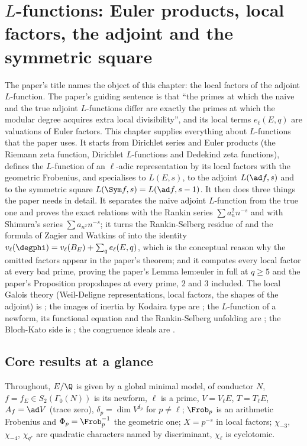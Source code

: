 \chapter{$L$-functions: Euler products, local factors, the adjoint and the symmetric square}\label{ch:lfunctions}

The paper's title names the object of this chapter: the local factors of the adjoint $L$-function. The paper's guiding sentence is that ``the
primes at which the naive and the true adjoint $L$-functions differ are exactly the primes at which the modular degree acquires extra local
divisibility'', and its local terms $e_\ell(E,q)$ are valuations of Euler factors. This chapter supplies everything about $L$-functions that the
paper uses. It starts from Dirichlet series and Euler products (the Riemann zeta function, Dirichlet $L$-functions and Dedekind zeta functions),
defines the $L$-function of an $\ell$-adic representation by its local factors with the geometric Frobenius, and specialises to $L(E,s)$, to the
adjoint $L(\ad f,s)$ and to the symmetric square $L(\Sym f,s)=L(\ad f,s-1)$. It then does three things the paper needs in detail. It
separates the naive adjoint $L$-function from the true one and proves the exact relations with the Rankin series $\sum a_n^2n^{-s}$ and with
Shimura's series $\sum a_{n^2}n^{-s}$; it turns the Rankin-Selberg residue of  and the formula of Zagier and Watkins of
 into the identity $v_\ell(\degphi)=v_\ell(B_E)+\sum_qe_\ell(E,q)$, which is the conceptual reason why the omitted factors appear in
the paper's theorem; and it computes every local factor at every bad prime, proving the paper's Lemma lem:euler in full at $q\ge5$ and the
paper's Proposition prop:shapes at every prime, $2$ and $3$ included. The local Galois theory (Weil-Deligne representations, local factors,
the shapes of the adjoint) is ; the images of inertia by Kodaira type are ; the $L$-function of a
newform, its functional equation and the Rankin-Selberg unfolding are ; the Bloch-Kato side is ; the
congruence ideals are .

\section*{Core results at a glance}

Throughout, $E/\Q$ is given by a global minimal model, of conductor $N$, $f=f_E\in S_2(\Gamma_0(N))$ is its newform, $\ell$ is a prime, $V=V_\ell E$,
$T=T_\ell E$, $A_f=\ad V$ (trace zero), $\delta_p=\dim V^{I_p}$ for $p\ne\ell$; $\Frob_p$ is an arithmetic Frobenius and $\Phi_p=\Frob_p^{-1}$ the geometric
one; $X=p^{-s}$ in local factors; $\chi_{-3}$, $\chi_{-4}$, $\chi_{q^*}$ are quadratic characters named by discriminant, $\chi_\ell$ is cyclotomic.

